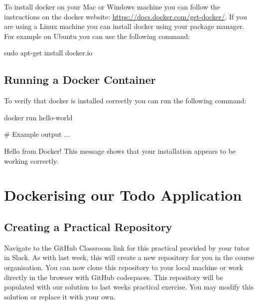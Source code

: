 \documentclass{csse4400}
\begin{document}
To install docker on your Mac or Windows machine you can follow the instructions on the docker website: \url{https://docs.docker.com/get-docker/}. If you are using a Linux machine you can install docker using your package manager. For example on Ubuntu you can use the following command:

\begin{code}[language=bash,numbers=none]{}
  sudo apt-get install docker.io
\end{code}



\subsection{Running a Docker Container}

To verify that docker is installed correctly you can run the following command:

\begin{code}[language=bash,numbers=none]{}
  docker run hello-world

  # Example output
  ...

  Hello from Docker!
  This message shows that your installation appears to be working correctly.
\end{code}


\section{Dockerising our Todo Application}


\subsection{Creating a Practical Repository}
Navigate to the GitHub Classroom link for this practical provided by your tutor in Slack.
As with last week, this will create a new repository for you in the course organisation.
You can now clone this repository to your local machine or work directly in the browser with GitHub codespaces.
This repository will be populated with our solution to last weeks practical exercise.
You may modify this solution or replace it with your own.
\end{document}
